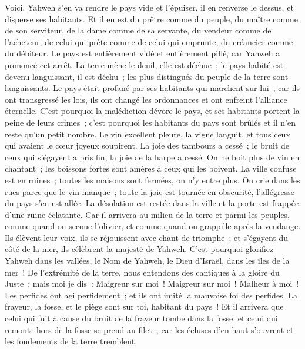 \begin{multicols}{2}
\VerseOne{}Voici, Yahweh s'en va rendre le pays vide et l'épuiser, il en renverse le dessus, et disperse ses habitants.
Et il en est du prêtre comme du peuple, du maître comme de son serviteur, de la dame comme de sa servante, du vendeur comme de l'acheteur, de celui qui prête comme de celui qui emprunte, du créancier comme du débiteur.
Le pays est entièrement vidé et entièrement pillé, car Yahweh a prononcé cet arrêt.
La terre mène le deuil, elle est déchue~; le pays habité est devenu languissant, il est déchu~; les plus distingués du peuple de la terre sont languissants.
Le pays était profané par ses habitants qui marchent sur lui~; car ils ont transgressé les lois, ils ont changé les ordonnances et ont enfreint l'alliance éternelle.
C'est pourquoi la malédiction dévore le pays, et ses habitants portent la peine de leurs crimes~; c'est pourquoi les habitants du pays sont brûlés et il n'en reste qu'un petit nombre.
Le vin excellent pleure, la vigne languit, et tous ceux qui avaient le cœur joyeux soupirent.
La joie des tambours a cessé~; le bruit de ceux qui s'égayent a pris fin, la joie de la harpe a cessé.
On ne boit plus de vin en chantant~; les boissons fortes sont amères à ceux qui les boivent.
La ville confuse est en ruines~; toutes les maisons sont fermées, on n'y entre plus.
On crie dans les rues parce que le vin manque~; toute la joie est tournée en obscurité, l'allégresse du pays s'en est allée.
La désolation est restée dans la ville et la porte est frappée d'une ruine éclatante.
Car il arrivera au milieu de la terre et parmi les peuples, comme quand on secoue l'olivier, et comme quand on grappille après la vendange.
Ils élèvent leur voix, ils se réjouissent avec chant de triomphe~; et s'égayent du côté de la mer, ils célèbrent la majesté de Yahweh.
C'est pourquoi glorifiez Yahweh dans les vallées, le Nom de Yahweh, le Dieu d'Israël, dans les îles de la mer~!
De l'extrémité de la terre, nous entendons des cantiques à la gloire du Juste~; mais moi je dis~: Maigreur sur moi~! Maigreur sur moi~! Malheur à moi~! Les perfides ont agi perfidement~; et ils ont imité la mauvaise foi des perfides.
La frayeur, la fosse, et le piège sont sur toi, habitant du pays~!
Et il arrivera que celui qui fuit à cause du bruit de la frayeur tombe dans la fosse, et celui qui remonte hors de la fosse se prend au filet~; car les écluses d'en haut s'ouvrent et les fondements de la terre tremblent.

\end{multicols}
